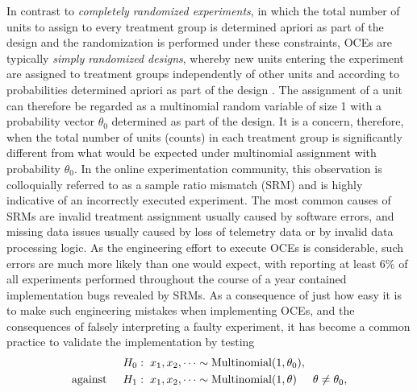 \documentclass[11pt]{article}
\begin{document}
In contrast to \textit{completely randomized experiments}, in which the total number of units to assign to every treatment group is determined apriori as part of the design and the randomization is performed under these constraints, OCEs are typically \textit{simply randomized designs}, whereby new units entering the experiment are assigned to treatment groups independently of other units and according to probabilities determined apriori as part of the design . The assignment of a unit can therefore be regarded as a multinomial random variable of size 1 with a probability vector $\theta_0$ determined as part of the design. It is a concern, therefore, when the total number of units (counts) in each treatment group is significantly different from what would be expected under multinomial assignment with probability $\theta_0$.   In the online experimentation community, this observation is colloquially referred to as a sample ratio mismatch (SRM) and is highly indicative of an incorrectly executed experiment. The most common causes of SRMs are invalid  treatment assignment usually caused by software errors, and missing data issues usually caused by loss of telemetry data or by invalid data processing logic. As the engineering effort to execute OCEs is considerable, such errors are much more likely than one would expect, with \cite{fabijan} reporting at least 6\% of all experiments performed throughout the course of a year contained implementation bugs revealed by SRMs. As a consequence of just how easy it is to make such engineering mistakes when implementing OCEs, and the consequences of falsely interpreting a faulty experiment, it has become a common practice to validate the implementation by testing
\begin{align}
  \label{eq:srm-hypothesis-test}
  H_0:&\hspace{0.2cm} x_1, x_2, \dots \sim \text{Multinomial}(1,\theta_0),\\
  \text{against}\hspace{0.5cm} H_1:&\hspace{0.2cm} x_1, x_2, \dots \sim \text{Multinomial}(1, \theta) \hspace{0.5cm} \theta \neq \theta_0,
\end{align}
\end{document}
